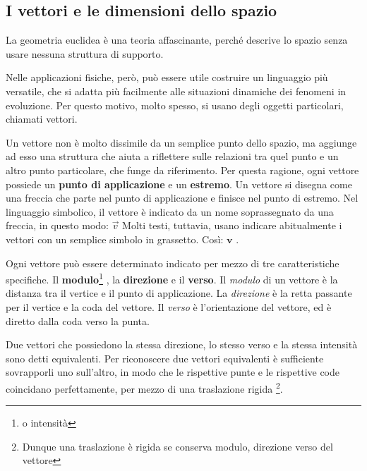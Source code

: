 \subsection*{I vettori e le dimensioni dello spazio}
La geometria euclidea è una teoria affascinante, perché descrive lo spazio senza usare nessuna struttura di supporto.

Nelle applicazioni fisiche, però, può essere utile costruire un linguaggio più versatile, che si adatta più facilmente alle situazioni dinamiche dei fenomeni in evoluzione. Per questo motivo, molto spesso, si usano degli oggetti particolari, chiamati vettori.
\newline

Un vettore non è molto dissimile da un semplice punto dello spazio, ma aggiunge ad esso una struttura che aiuta a riflettere sulle relazioni tra quel punto e un altro punto particolare, che funge da riferimento. Per questa ragione, ogni vettore possiede un {\bfseries punto di applicazione} e un {\bfseries estremo}. Un vettore si disegna come una freccia che parte nel punto di applicazione e finisce nel punto di estremo.\newline
Nel linguaggio simbolico, il vettore è indicato da un nome soprassegnato da una freccia, in questo modo: $\vec v$\newline
Molti testi, tuttavia, usano indicare abitualmente i vettori con un semplice simbolo in grassetto. Così: $ \mathbf v$ .
\newline

Ogni vettore può essere determinato indicato per mezzo di tre caratteristiche specifiche. Il {\bfseries modulo}\footnote {o intensità} , la {\bfseries direzione} e il {\bfseries verso}.\newline
Il {\slshape modulo} di un vettore è la distanza tra il vertice e il punto di applicazione.\newline
La {\slshape direzione} è la retta passante per il vertice e la coda del vettore.\newline
Il {\slshape verso} è l'orientazione del vettore, ed è diretto dalla coda verso la punta.
\newline

Due vettori che possiedono la stessa direzione, lo stesso verso e la stessa intensità sono detti equivalenti. Per riconoscere due vettori equivalenti è sufficiente sovrapporli uno sull'altro, in modo che le rispettive punte e le rispettive code coincidano perfettamente, per mezzo di una traslazione rigida \footnote {Dunque una traslazione è rigida se conserva modulo, direzione verso del vettore}.
\newline

